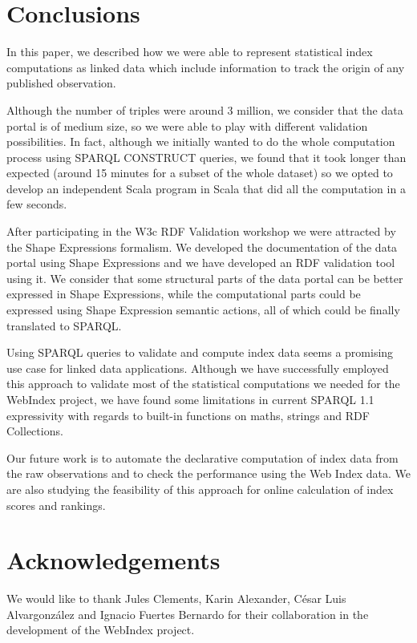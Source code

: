 \documentclass{acm_proc_article-sp}
\newcommand{\TODO}[1]{{\color{red}{\textbf{TODO: {#1}}\xspace}}}
\begin{document}
\section{Conclusions}

In this paper, we described how we were able to represent statistical index computations as linked data which include information to track the origin of any published observation.

Although the number of triples were around 3 million, we consider that the data portal is of medium size, so we were able to play with different validation possibilities.
In fact, although we initially wanted to do the whole computation process using SPARQL CONSTRUCT queries, we found that it took longer than expected (around 15 minutes for a subset of the whole dataset) so we opted to develop an independent Scala program in Scala that did all the computation in a few seconds.

After participating in the W3c RDF Validation workshop we were attracted by the Shape Expressions formalism. We developed the documentation of the data portal using Shape Expressions and we have developed an RDF validation tool using it. We consider that some structural parts of the data portal can be better expressed in Shape Expressions, while the computational parts could be expressed using Shape Expression semantic actions, all of which could be finally translated to SPARQL.

Using SPARQL queries to validate and compute index data seems a promising use
case for linked data applications. 
Although we have successfully employed this approach to validate most of the
statistical computations we needed for the WebIndex project, we have found some
limitations in current SPARQL 1.1 expressivity with regards to built-in
functions on maths, strings and RDF Collections.

Our future work is to automate the declarative computation of index data
 from the raw observations and to check the performance using
 the Web Index data. 
We are also studying the feasibility of this approach 
 for online calculation of index scores and rankings. 

\section{Acknowledgements}

We would like to thank Jules Clements, Karin Alexander, César Luis Alvargonzález and Ignacio Fuertes Bernardo for their collaboration in the development of the WebIndex project.



\end{document}
